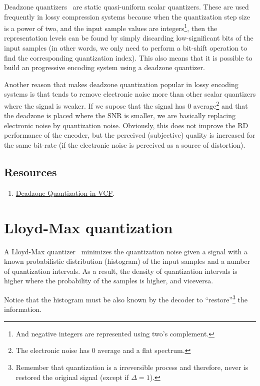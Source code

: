 Deadzone quantizers~\cite{vruiz__scalar_quantization} are static
quasi-uniform scalar quantizers. These are used frequently in lossy
compression systems because when the quantization step size is a power
of two, and the input sample values are integers\footnote{And negative
integers are represented using two's complement.}, then the
representation levels can be found by simply discarding
low-significant bits of the input samples (in other words, we only
need to perform a bit-shift operation to find the corresponding
quantization index). This also means that it is possible to build an
progressive encoding system using a deadzone quantizer.

Another reason that makes deadzone quantization popular in lossy
encoding systems is that tends to remove electronic noise more than
other scalar quantizers where the signal is weaker. If we supose that
the signal has 0 average\footnote{The electronic noise has 0 average
and a flat spectrum.} and that the deadzone is placed where the SNR is
smaller, we are basically replacing electronic noise by quantization
noise. Obviously, this does not improve the RD performance of the
encoder, but the perceived (subjective) quality is increased for the
same bit-rate (if the electronic noise is perceived as a source of
distortion).

\subsection*{Resources}
\begin{enumerate}
\item
  \href{https://github.com/Sistemas-Multimedia/VCF/blob/main/src/deadzone.py}{Deadzone
    Quantization in VCF}.
\end{enumerate}

\section{Lloyd-Max quantization}

A Lloyd-Max quantizer~\cite{vruiz__scalar_quantization} minimizes the
quantization noise given a signal with a known probabilistic
distribution (histogram) of the input samples and a number of
quantization intervals. As a result, the density of quantization
intervals is higher where the probability of the samples is higher, and
viceversa.

Notice that the histogram must be also known by the decoder to
``restore''\footnote{Remember that quantization is a irreversible
process and therefore, never is restored the original signal (except
if $\Delta=1$).} the information.

